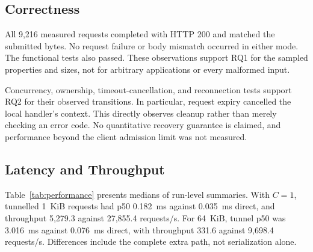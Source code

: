 \documentclass[conference,letterpaper]{IEEEtran}
\begin{document}
\subsection{Correctness}
All 9,216 measured requests completed with HTTP 200 and matched the submitted
bytes. No request failure or body mismatch occurred in either mode. The
functional tests also passed. These observations support RQ1 for the sampled
properties and sizes, not for arbitrary applications or every malformed input.

Concurrency, ownership, timeout-cancellation, and reconnection tests support
RQ2 for their observed transitions. In particular, request expiry cancelled
the local handler's context. This directly observes cleanup rather than merely
checking an error code. No quantitative recovery guarantee is claimed, and
performance beyond the client admission limit was not measured.

\subsection{Latency and Throughput}
Table~\ref{tab:performance} presents medians of run-level summaries.
With $C=1$, tunnelled 1~KiB requests had p50 0.182~ms against 0.035~ms direct,
and throughput 5,279.3 against 27,855.4 requests/s. For 64~KiB, tunnel p50 was
3.016~ms against 0.076~ms direct, with throughput 331.6 against 9,698.4
requests/s. Differences include the complete extra path, not serialization
alone.
\end{document}
